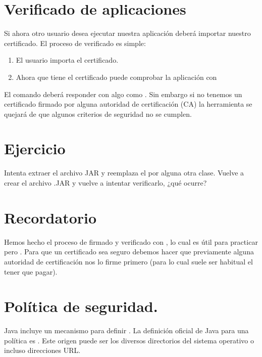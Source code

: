 \documentclass[letterpaper,10pt,spanish]{sphinxmanual}
\begin{document}
\section{Verificado de aplicaciones}
\label{\detokenize{textos/tema5:verificado-de-aplicaciones}}
Si ahora otro usuario desea ejecutar nuestra aplicación deberá importar nuestro certificado. El proceso de verificado es simple:
\begin{enumerate}
%
\item {} 
El usuario importa el certificado.

\item {} 
Ahora que tiene el certificado puede comprobar la aplicación con 

\end{enumerate}

El comando deberá responder con algo como . Sin embargo si no tenemos un certificado firmado por alguna autoridad de certificación (CA) la herramienta se quejará de que algunos criterios de seguridad no se cumplen.


\section{Ejercicio}
\label{\detokenize{textos/tema5:ejercicio}}
Intenta extraer el archivo JAR y reemplaza el  por alguna otra clase. Vuelve a crear el archivo .JAR y vuelve a intentar verificarlo, ¿qué ocurre?


\section{Recordatorio}
\label{\detokenize{textos/tema5:recordatorio}}
Hemos hecho el proceso de firmado y verificado con , lo cual es útil para practicar pero . Para que un certificado sea seguro debemos hacer que previamente alguna autoridad de certificación nos lo firme primero (para lo cual suele ser habitual el tener que pagar).


\section{Política de seguridad.}
\label{\detokenize{textos/tema5:politica-de-seguridad}}
Java incluye un mecanismo para definir . La definición oficial de Java para una política es . Este origen puede ser los diversos directorios del sistema operativo o incluso direcciones URL.
\end{document}
